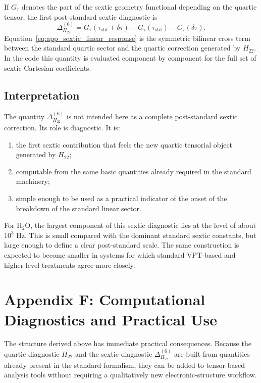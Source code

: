 \documentclass[aip,jcp,reprint,floatfix]{revtex4-2}
\begin{document}
If $G_\tau$ denotes the part of the sextic geometry functional depending on the
quartic tensor, the first post-standard sextic diagnostic is
\begin{equation}
\Delta^{(6)}_{H_{22}}
=
G_\tau(\tau_{\mathrm{std}}+\delta\tau)
-G_\tau(\tau_{\mathrm{std}})
-G_\tau(\delta\tau).
\label{eq:app_sextic_linear_response}
\end{equation}
Equation~\eqref{eq:app_sextic_linear_response} is the symmetric bilinear cross
term between the standard quartic sector and the quartic correction generated
by $H_{22}$. In the code this quantity is evaluated component by component for
the full set of sextic Cartesian coefficients.

\subsection{Interpretation}

The quantity $\Delta^{(6)}_{H_{22}}$ is not intended here as a complete
post-standard sextic correction. Its role is diagnostic. It is:
\begin{enumerate}
\item the first sextic contribution that feels the new quartic tensorial object
generated by $H_{22}$;
\item computable from the same basic quantities already required in the
standard machinery;
\item simple enough to be used as a practical indicator of the onset of the
breakdown of the standard linear sector.
\end{enumerate}

For H$_2$O, the largest component of this sextic diagnostic lies at the level
of about $10^3$ Hz. This is small compared with the dominant standard sextic
constants, but large enough to define a clear post-standard scale. The same
construction is expected to become smaller in systems for which standard
VPT-based and higher-level treatments agree more closely.

\section{Appendix F: Computational Diagnostics and Practical Use}

The structure derived above has immediate practical consequences. Because the
quartic diagnostic $H_{22}$ and the sextic diagnostic
$\Delta^{(6)}_{H_{22}}$ are built from quantities already present in the
standard formalism, they can be added to tensor-based analysis tools without
requiring a qualitatively new electronic-structure workflow.
\end{document}

